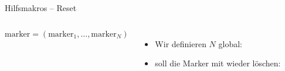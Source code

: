 \begin{frame}[c,fragile]{Hilfsmakros -- Reset}
    \footnotesize\begin{columns}[c,onlytextwidth]%
\begin{algorithm}[H]
    \PreCode
    \StartCode
    \(\mathrm{marker} = (\mathrm{marker}_1, \ldots, \mathrm{marker}_N)\)\;
\end{algorithm}
\begin{itemize}[<+(1)->]
    \item Wir definieren \(N\) global: 
    \item {} soll die Marker mit  wieder löschen:\pause
\begin{plainxlatex}[morekeywords={[5]{\\i}}]
\newcommand{\SieveReset}{
    \foreach \i in {1,...,\N}{
        \csgundef{marker@!**!\i}
    }
}
\end{plainxlatex}
\end{itemize}
\end{columns}
\end{frame}

